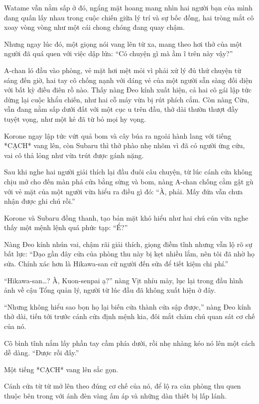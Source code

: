 \documentclass[../main.tex]{subfiles}
\begin{document}
Watame vẫn nằm sấp ở đó, ngẩng mặt hoang mang nhìn hai người bạn của mình đang quấn lấy nhau trong cuộc chiến giữa lý trí và sự bốc đồng, hai tròng mắt cô xoay vòng vòng như một cái chong chóng đang quay chậm.

Nhưng ngay lúc đó, một giọng nói vang lên từ xa, mang theo hơi thở của một người đã quá quen với việc dập lửa: ``Có chuyện gì mà ầm ĩ trên này vậy?''

A-chan ló đầu vào phòng, vẻ mặt hơi mệt mỏi vì phải xử lý đủ thứ chuyện từ sáng đến giờ, hai tay cô chống nạnh với dáng vẻ của một người sẵn sàng đối diện với bất kỳ điều điên rồ nào. Thấy nàng Đeo kính xuất hiện, cả hai cô gái lập tức dừng lại cuộc khẩu chiến, như hai cỗ máy vừa bị rút phích cắm. Còn nàng Cừu, vẫn đang nằm sấp dưới đất với một cục u trên đầu, thở dài thườn thượt đầy tuyệt vọng, như một kẻ đã từ bỏ mọi hy vọng.


Korone ngay lập tức vứt quả bom và cây búa ra ngoài hành lang với tiếng *CẠCH* vang lên, còn Subaru thì thở phào nhẹ nhõm vì đã có người ứng cứu, vai cô thả lỏng như vừa trút được gánh nặng.

\ct

Sau khi nghe hai người giải thích lại đầu đuôi câu chuyện, từ lúc cánh cửa không chịu mở cho đến màn phá cửa bằng sừng và bom, nàng A-chan chống cằm gật gù với vẻ mặt của một người vừa hiểu ra điều gì đó: ``À, phải. Mấy đứa vẫn chưa nhận được ghi chú rồi.''

Korone và Subaru đồng thanh, tạo bản mặt khó hiểu như hai chú cún vừa nghe thấy một mệnh lệnh quá phức tạp: ``Ể?''

Nàng Đeo kính nhún vai, chậm rãi giải thích, giọng điềm tĩnh nhưng vẫn lộ rõ sự bất lực: ``Dạo gần đây cửa của phòng thu này bị kẹt nhiều lắm, nên tôi đã nhờ họ sửa. Chính xác hơn là Hikawa-san cử người đến sửa để tiết kiệm chi phí.''

``Hikawa-san\dots? À, Kuon-senpai ạ?'' nàng Vịt nhíu mày, lục lại trong đầu hình ảnh về cậu Tổng quản lý, người từ lúc đầu đã không xuất hiện ở đây.

``Nhưng không hiểu sao bọn họ lại biến cửa thành cửa sập được,'' nàng Đeo kính thở dài, tiến tới trước cánh cửa định mệnh kia, đôi mắt chăm chú quan sát cơ chế của nó.

Cô bình tĩnh nắm lấy phần tay cầm phía dưới, rồi nhẹ nhàng kéo nó lên một cách dễ dàng. ``Được rồi đấy.''

Một tiếng *CẠCH* vang lên sắc gọn.

Cánh cửa từ từ mở lên theo đúng cơ chế của nó, để lộ ra căn phòng thu quen thuộc bên trong với ánh đèn vàng ấm áp và những dàn thiết bị lấp lánh.
\end{document}
